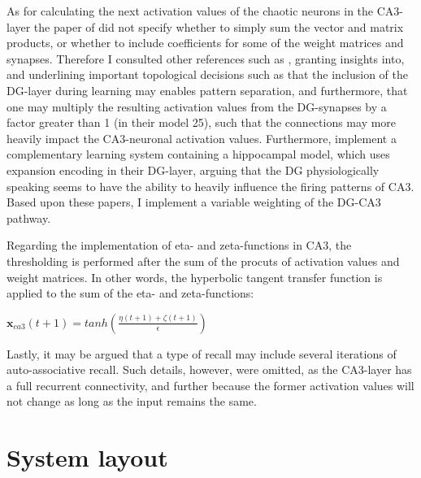 As for calculating the next activation values of the chaotic neurons in the CA3-layer the paper of \cite{Hattori2014} did not specify whether to simply sum the vector and matrix products, or whether to include coefficients for some of the weight matrices and synapses. Therefore I consulted other references such as \citep{Wakagi2008}, granting insights into, and underlining important topological decisions such as that the inclusion of the DG-layer during learning may enables pattern separation, and furthermore, that one may multiply the resulting activation values from the DG-synapses by a factor greater than 1 (in their model 25), such that the connections may more heavily impact the CA3-neuronal activation values.
Furthermore, \cite{Norman2003} implement a complementary learning system containing a hippocampal model, which uses expansion encoding in their DG-layer, arguing that the DG physiologically speaking seems to have the ability to heavily influence the firing patterns of CA3. 
Based upon these papers, I implement a variable weighting of the DG-CA3 pathway. 

Regarding the implementation of eta- and zeta-functions in CA3, the thresholding is performed after the sum of the procuts of activation values and weight matrices. In other words, the hyperbolic tangent transfer function is applied to the sum of the eta- and zeta-functions: 

\begin{center}
\begin{math}
    \textbf{x}_{ca3}(t+1) = tanh(\frac{\eta(t+1) + \zeta(t+1)}{\epsilon})
\end{math}
\end{center}

Lastly, it may be argued that a type of recall may include several iterations of auto-associative recall. Such details, however, were omitted, as the CA3-layer has a full recurrent connectivity, and further because the former activation values will not change as long as the input remains the same.


\section{System layout}

